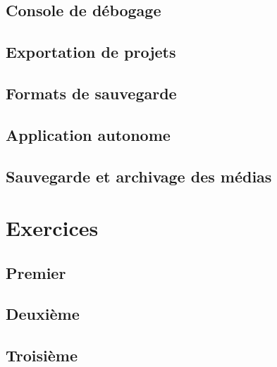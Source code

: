 \documentclass[
]{book}
\begin{document}
\hypertarget{console-de-duxe9bogage}{%
\section{Console de débogage}\label{console-de-duxe9bogage}}

\hypertarget{exportation-de-projets}{%
\section{Exportation de projets}\label{exportation-de-projets}}

\hypertarget{formats-de-sauvegarde}{%
\section{Formats de sauvegarde}\label{formats-de-sauvegarde}}

\hypertarget{application-autonome}{%
\section{Application autonome}\label{application-autonome}}

\hypertarget{sauvegarde-et-archivage-des-muxe9dias}{%
\section{Sauvegarde et archivage des médias}\label{sauvegarde-et-archivage-des-muxe9dias}}

\hypertarget{exercices}{%
\chapter{Exercices}\label{exercices}}

\hypertarget{premier}{%
\section{Premier}\label{premier}}

\hypertarget{deuxiuxe8me}{%
\section{Deuxième}\label{deuxiuxe8me}}

\hypertarget{troisiuxe8me}{%
\section{Troisième}\label{troisiuxe8me}}

  
\end{document}
